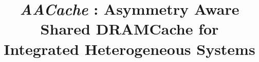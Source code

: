 \documentclass[pageno]{jpaper}
\newcommand{\cachename}{\textit{AACache }}
\begin{document}
\title{\textit{\cachename}: Asymmetry Aware Shared DRAMCache for Integrated Heterogeneous Systems}

\date{}
\maketitle

\thispagestyle{empty}




















\end{document}
